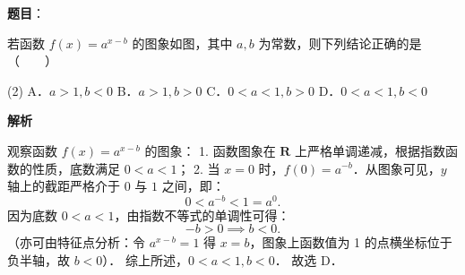 \begin{answer}

\textbf{题目}：

若函数 $f(x) = a^{x-b}$ 的图象如图，其中 $a, b$ 为常数，则下列结论正确的是\mbox{（　　）}
\nopagebreak[4]
\begin{center}\end{center}
\nopagebreak[4]
\begin{gkopts}(2)
\task A．$a > 1, b < 0$
\task B．$a > 1, b > 0$
\task C．$0 < a < 1, b > 0$
\task D．$0 < a < 1, b < 0$
\end{gkopts}

\textbf{解析}

观察函数 $f(x) = a^{x-b}$ 的图象：
1. 函数图象在 $\mathbf{R}$ 上严格单调递减，根据指数函数的性质，底数满足 $0 < a < 1$；
2. 当 $x = 0$ 时，$f(0) = a^{-b}$．从图象可见，$y$ 轴上的截距严格介于 $0$ 与 $1$ 之间，即：
\nopagebreak[4]
\[
0 < a^{-b} < 1 = a^0.
\]
因为底数 $0 < a < 1$，由指数不等式的单调性可得：
\nopagebreak[4]
\[
-b > 0 \implies b < 0.
\]
（亦可由特征点分析：令 $a^{x-b} = 1$ 得 $x = b$，图象上函数值为 1 的点横坐标位于负半轴，故 $b < 0$）．
综上所述，$0 < a < 1, b < 0$．
故选 D．


\end{answer}
